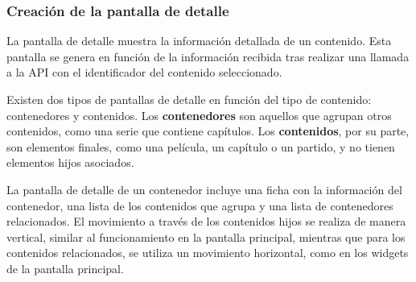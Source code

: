 \subsubsection{Creación de la pantalla de detalle}
\label{sec:creacion_pantalla_detalle}
La pantalla de detalle muestra la información detallada de un contenido. Esta pantalla se genera en función de la información recibida 
tras realizar una llamada a la API con el identificador del contenido seleccionado.

Existen dos tipos de pantallas de detalle en función del tipo de contenido: contenedores y contenidos. Los \textbf{contenedores} son aquellos 
que agrupan otros contenidos, como una serie que contiene capítulos. Los \textbf{contenidos}, por su parte, son elementos finales, como una película, 
un capítulo o un partido, y no tienen elementos hijos asociados.

La pantalla de detalle de un contenedor incluye una ficha con la información del contenedor, una lista de los contenidos que agrupa y una 
lista de contenedores relacionados. El movimiento a través de los contenidos hijos se realiza de manera vertical, similar al funcionamiento 
en la pantalla principal, mientras que para los contenidos relacionados, se utiliza un movimiento horizontal, como en los widgets de la pantalla principal.

